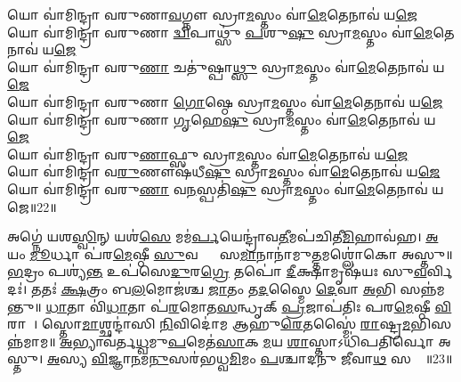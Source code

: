𑌯𑍋 𑌵𑌾॑𑌮𑌿𑌨𑍍𑌦𑍍𑌰𑌾 𑌵𑌰𑍁𑌣𑌾\ul{𑌵}𑌗𑍍𑌨𑍗 𑌸𑍍𑌰𑌾\ul{𑌮}𑌸𑍍𑌤𑌂 𑌵𑌾॑\ul{𑌮𑍇}𑌤𑍇𑌨𑌾𑌵॑ 𑌯\ul{𑌜𑍇}\\
𑌯𑍋 𑌵𑌾॑𑌮𑌿𑌨𑍍𑌦𑍍𑌰𑌾 𑌵𑌰𑍁𑌣𑌾 \ul{𑌦𑍍𑌵𑌿}𑌪𑌾𑌥𑍍𑌸𑍁॑ \ul{𑌪}𑌶𑍁\ul{𑌷𑍁} 𑌸𑍍𑌰𑌾\ul{𑌮}𑌸𑍍𑌤𑌂 𑌵𑌾॑\ul{𑌮𑍇}𑌤𑍇𑌨𑌾𑌵॑ 𑌯\ul{𑌜𑍇}\\
𑌯𑍋 𑌵𑌾॑𑌮𑌿𑌨𑍍𑌦𑍍𑌰𑌾 𑌵𑌰𑍁\ul{𑌣𑌾} 𑌚𑌤𑍁॑𑌷𑍍𑌪𑌾\ul{𑌥𑍍𑌸𑍁} 𑌸𑍍𑌰𑌾\ul{𑌮}𑌸𑍍𑌤𑌂 𑌵𑌾॑\ul{𑌮𑍇}𑌤𑍇𑌨𑌾𑌵॑ 𑌯\ul{𑌜𑍇}\\
𑌯𑍋 𑌵𑌾॑𑌮𑌿𑌨𑍍𑌦𑍍𑌰𑌾 𑌵𑌰𑍁𑌣𑌾 \ul{𑌗𑍋}𑌷𑍍𑌠𑍇 𑌸𑍍𑌰𑌾\ul{𑌮}𑌸𑍍𑌤𑌂 𑌵𑌾॑\ul{𑌮𑍇}𑌤𑍇𑌨𑌾𑌵॑ 𑌯\ul{𑌜𑍇}\\
𑌯𑍋 𑌵𑌾॑𑌮𑌿𑌨𑍍𑌦𑍍𑌰𑌾 𑌵𑌰𑍁𑌣𑌾 \ul{𑌗𑍃}𑌹𑍇\ul{𑌷𑍁} 𑌸𑍍𑌰𑌾\ul{𑌮}𑌸𑍍𑌤𑌂 𑌵𑌾॑\ul{𑌮𑍇}𑌤𑍇𑌨𑌾𑌵॑ 𑌯\ul{𑌜𑍇}\\
𑌯𑍋 𑌵𑌾॑𑌮𑌿𑌨𑍍𑌦𑍍𑌰𑌾 𑌵𑌰𑍁\ul{𑌣𑌾}𑌫𑍍𑌸𑍁 𑌸𑍍𑌰𑌾\ul{𑌮}𑌸𑍍𑌤𑌂 𑌵𑌾॑\ul{𑌮𑍇}𑌤𑍇𑌨𑌾𑌵॑ 𑌯\ul{𑌜𑍇}\\
𑌯𑍋 𑌵𑌾॑𑌮𑌿𑌨𑍍𑌦𑍍𑌰𑌾 𑌵\ul{𑌰𑍁}𑌣𑍗𑌷॑𑌧𑍀\ul{𑌷𑍁} 𑌸𑍍𑌰𑌾\ul{𑌮}𑌸𑍍𑌤𑌂 𑌵𑌾॑\ul{𑌮𑍇}𑌤𑍇𑌨𑌾𑌵॑ 𑌯\ul{𑌜𑍇}\\
𑌯𑍋 𑌵𑌾॑𑌮𑌿𑌨𑍍𑌦𑍍𑌰𑌾 𑌵𑌰𑍁\ul{𑌣𑌾} 𑌵\ul{𑌨}𑌸𑍍𑌪𑌤𑌿॑\ul{𑌷𑍁} 𑌸𑍍𑌰𑌾\ul{𑌮}𑌸𑍍𑌤𑌂 𑌵𑌾॑\ul{𑌮𑍇}𑌤𑍇𑌨𑌾𑌵॑ 𑌯𑌜𑍇॥22॥

𑌅𑌗𑍍𑌨𑍇॑ 𑌯𑌶\ul{𑌸𑍍𑌵𑌿}𑌨𑍍 𑌯𑌶॑\ul{𑌸𑍇} 𑌮𑌮॑\ul{𑌰𑍍𑌪}𑌯𑍇𑌨𑍍𑌦𑍍𑌰𑌾॑𑌵\ul{𑌤𑍀}𑌮𑌪॑𑌚𑌿𑌤𑍀\ul{𑌮𑌿}𑌹𑌾𑌵॑𑌹।
\ul{𑌅}𑌯𑌂 \ul{𑌮𑍂}𑌰𑍍𑌧𑌾 𑌪॑𑌰\ul{𑌮𑍇}𑌷𑍍𑌠𑍀 \ul{𑌸𑍁}𑌵𑌰𑍍𑌚𑌾𑌃᳚ 𑌸\ul{𑌮𑌾}𑌨𑌾𑌨𑌾॑𑌮𑍁\ul{𑌤𑍍𑌤}𑌮𑌶𑍍𑌲𑍋॑𑌕𑍋 𑌅𑌸𑍍𑌤𑍁॥
\ul{𑌭}𑌦𑍍𑌰𑌂 𑌪𑌶𑍍𑌯॑\ul{𑌨𑍍𑌤} 𑌉𑌪॑𑌸𑍇\ul{𑌦𑍁}𑌰\ul{𑌗𑍍𑌰𑍇} 𑌤𑌪𑍋॑ \ul{𑌦𑍀}𑌕𑍍𑌷𑌾𑌮𑍃𑌷॑𑌯𑌃 𑌸𑍁\ul{𑌵}𑌰𑍍𑌵𑌿𑌦𑌃॑।
𑌤𑌤𑌃॑ \ul{𑌕𑍍𑌷}𑌤𑍍𑌰𑌂 𑌬\ul{𑌲}𑌮𑍋𑌜॑𑌶𑍍𑌚 \ul{𑌜𑌾}𑌤𑌂 𑌤\ul{𑌦}𑌸𑍍𑌮𑍈 \ul{𑌦𑍇}𑌵𑌾 \ul{𑌅}𑌭𑌿 𑌸𑌨𑍍𑌨॑𑌮𑌨𑍍𑌤𑍁॥
\ul{𑌧𑌾}𑌤𑌾 𑌵𑌿॑\ul{𑌧𑌾}𑌤𑌾 𑌪॑\ul{𑌰}𑌮𑍋𑌤\ul{𑌸}𑌨𑍍𑌧𑍃𑌕𑍍 \ul{𑌪𑍍𑌰}𑌜𑌾𑌪॑𑌤𑌿𑌃 𑌪𑌰\ul{𑌮𑍇}𑌷𑍍𑌠𑍀 \ul{𑌵𑌿}𑌰𑌾𑌜𑌾᳚।
𑌸𑍍𑌤𑍋\ul{𑌮𑌾}𑌶𑍍𑌛𑌨𑍍𑌦𑌾॑𑌸𑌿 \ul{𑌨𑌿}𑌵𑌿𑌦𑍋॑𑌮 𑌆𑌹𑍁\ul{𑌰𑍇}𑌤𑌸𑍍𑌮𑍈॑ \ul{𑌰𑌾}𑌷𑍍𑌟𑍍𑌰\ul{𑌮}𑌭𑌿𑌸𑌨𑍍𑌨॑𑌮𑌾𑌮॥
\ul{𑌅}𑌭𑍍𑌯𑌾𑌵॑𑌰𑍍𑌤\ul{𑌧𑍍𑌵}𑌮𑍁\ul{𑌪}𑌮𑍇𑌤॑\ul{𑌸𑌾}𑌕 \ul{𑌮}𑌯 \ul{𑌶𑌾}𑌸𑍍𑌤𑌾𑌽𑌧𑌿॑𑌪𑌤𑌿𑌰𑍍𑌵𑍋 𑌅𑌸𑍍𑌤𑍁।
\ul{𑌅}𑌸𑍍𑌯 \ul{𑌵𑌿}𑌜𑍍𑌞𑌾\ul{𑌨}𑌮\ul{𑌨𑍁}𑌸𑌰॑𑌭𑌧𑍍𑌵\ul{𑌮𑌿}𑌮𑌂 \ul{𑌪}𑌶𑍍𑌚𑌾𑌦𑌨𑍁॑ 𑌜𑍀𑌵𑌾\ul{𑌥} 𑌸𑌰𑍍𑌵𑍇᳚॥23॥


